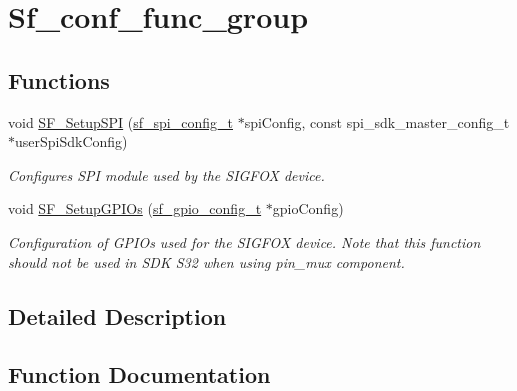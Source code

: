 \hypertarget{group__sf__conf__func__group}{}\section{Sf\+\_\+conf\+\_\+func\+\_\+group}
\label{group__sf__conf__func__group}
\subsection*{Functions}
\begin{DoxyCompactItemize}
\item 
void \mbox{\hyperlink{group__sf__conf__func__group_ga68177f0281489ba75661dc8517f4d547}{S\+F\+\_\+\+Setup\+S\+PI}} (\mbox{\hyperlink{structsf__spi__config__t}{sf\+\_\+spi\+\_\+config\+\_\+t}} $\ast$spi\+Config, const spi\+\_\+sdk\+\_\+master\+\_\+config\+\_\+t $\ast$user\+Spi\+Sdk\+Config)
\begin{DoxyCompactList}\small\item\em Configures S\+PI module used by the S\+I\+G\+F\+OX device. \end{DoxyCompactList}\item 
void \mbox{\hyperlink{group__sf__conf__func__group_ga03c809115624f8f392eacf4baf087a55}{S\+F\+\_\+\+Setup\+G\+P\+I\+Os}} (\mbox{\hyperlink{structsf__gpio__config__t}{sf\+\_\+gpio\+\_\+config\+\_\+t}} $\ast$gpio\+Config)
\begin{DoxyCompactList}\small\item\em Configuration of G\+P\+I\+Os used for the S\+I\+G\+F\+OX device. Note that this function should not be used in S\+DK S32 when using pin\+\_\+mux component. \end{DoxyCompactList}\end{DoxyCompactItemize}


\subsection{Detailed Description}


\subsection{Function Documentation}
\mbox{\label{group__sf__conf__func__group_ga03c809115624f8f392eacf4baf087a55}} 
